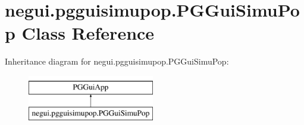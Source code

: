 \hypertarget{classnegui_1_1pgguisimupop_1_1PGGuiSimuPop}{}\section{negui.\+pgguisimupop.\+P\+G\+Gui\+Simu\+Pop Class Reference}
\label{classnegui_1_1pgguisimupop_1_1PGGuiSimuPop}
Inheritance diagram for negui.\+pgguisimupop.\+P\+G\+Gui\+Simu\+Pop\+:\begin{figure}[H]
\begin{center}
\leavevmode
\includegraphics[height=2.000000cm]{classnegui_1_1pgguisimupop_1_1PGGuiSimuPop}
\end{center}
\end{figure}

